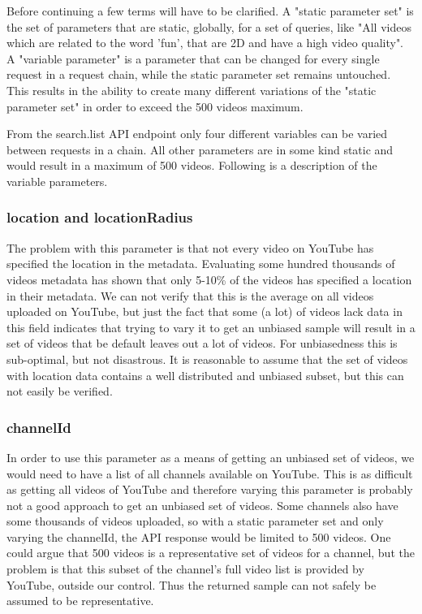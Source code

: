 Before continuing a few terms will have to be clarified. A  "static parameter 
set" is the set of parameters that are static, globally, for a set of queries, 
like "All videos which are related to the word 'fun', that are 2D and have a 
high video quality". A "variable parameter" is a parameter that can be changed 
for every single request in a request chain, while the static parameter set 
remains untouched. This results in the ability to create many different
variations of the "static parameter set" in order to exceed the 500 videos 
maximum.

From the search.list API endpoint only four different variables can be varied 
between requests in a chain. All other parameters are in some kind static and
would result in a maximum of 500 videos. Following is a description of the
variable parameters.

\subsubsection{location and locationRadius}
The problem with this parameter is that not every video on YouTube has specified
the location in the metadata. Evaluating some hundred thousands of videos
metadata has shown that only 5-10\% of the videos has specified a location in
their metadata. We can not verify that this is the average on all videos
uploaded on YouTube, but just the fact that some (a lot) of videos lack data in
this field indicates that trying to vary it to get an unbiased sample will
result in a set of videos that be default leaves out a lot of videos. For
unbiasedness this is sub-optimal, but not disastrous. It is reasonable to
assume that the set of videos with location data contains a well distributed
and unbiased subset, but this can not easily be verified.

\subsubsection{channelId}
In order to use this parameter as a means of getting an unbiased set of videos,
we would need to have a list of all channels available on YouTube. This is as
difficult as getting all videos of YouTube and therefore varying this parameter 
is probably not a good approach to get an unbiased set of videos. Some channels
also have some thousands of videos uploaded, so with a static parameter set and
only varying the channelId, the API response would be limited to 500 videos. One
could argue that 500 videos is a representative set of videos for a channel, but
the problem is that this subset of the channel's full video list is provided by
YouTube, outside our control. Thus the returned sample can not safely be assumed
to be representative.

